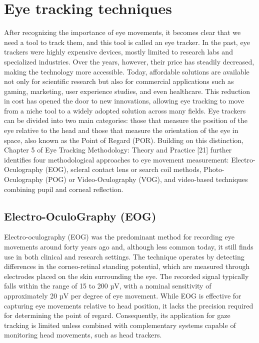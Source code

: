 \documentclass[12pt]{report}
\begin{document}
\section{Eye tracking techniques}

After recognizing the importance of eye movements, it becomes clear that we need a tool to track them, and this tool is called an eye tracker.
In the past, eye trackers were highly expensive devices, mostly limited to research labs and specialized industries.
Over the years, however, their price has steadily decreased, making the technology more accessible.
Today, affordable solutions are available not only for scientific research but also for commercial applications such as gaming, marketing, user experience studies, and even healthcare.
This reduction in cost has opened the door to new innovations, allowing eye tracking to move from a niche tool to a widely adopted solution across many fields.
Eye trackers can be divided into two main categories: those that measure the position of the eye relative to the head and those that measure the orientation of the eye in space, also known as the Point of Regard (POR).
Building on this distinction, Chapter 5 of Eye Tracking Methodology: Theory and Practice [21] further identifies four methodological approaches to eye movement measurement: Electro-Oculography (EOG), scleral contact lens or search coil methods, Photo-Oculography (POG) or Video-Oculography (VOG), and video-based techniques combining pupil and corneal reflection.

\subsection{Electro-OculoGraphy (EOG)}

Electro-oculography (EOG) was the predominant method for recording eye movements around forty years ago and, although less common today, it still finds use in both clinical and research settings.
The technique operates by detecting differences in the corneo-retinal standing potential, which are measured through electrodes placed on the skin surrounding the eye. The recorded signal typically falls within the range of 15 to 200 µV, with a nominal sensitivity of approximately 20 µV per degree of eye movement. While EOG is effective for capturing eye movements relative to head position, it lacks the precision required for determining the point of regard. Consequently, its application for gaze tracking is limited unless combined with complementary systems capable of monitoring head movements, such as head trackers.
\end{document}

